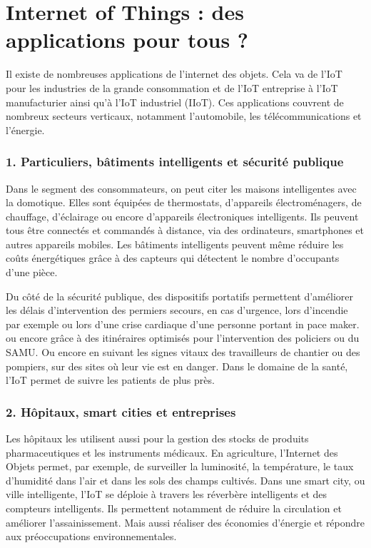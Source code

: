\section{Internet of Things : des applications pour tous ?}
Il existe de nombreuses applications de l’internet des objets. Cela va de l’IoT pour les industries de la grande consommation et de l’IoT entreprise à l’IoT manufacturier ainsi qu’à l’IoT industriel (IIoT). Ces applications couvrent de nombreux secteurs verticaux, notamment l’automobile, les télécommunications et l’énergie.

\subsubsection{1. Particuliers, bâtiments intelligents et sécurité publique}

Dans le segment des consommateurs, on peut citer les maisons intelligentes avec la domotique. Elles sont équipées de thermostats, d’appareils électroménagers, de chauffage, d’éclairage ou encore d’appareils électroniques intelligents. Ils peuvent tous être connectés et commandés à distance, via des ordinateurs, smartphones et autres appareils mobiles. Les bâtiments intelligents peuvent même réduire les coûts énergétiques grâce à des capteurs qui détectent le nombre d’occupants d’une pièce.

Du côté de la sécurité publique, des dispositifs portatifs permettent d’améliorer les délais d’intervention des permiers secours, en cas d’urgence, lors d’incendie par exemple ou lors d’une crise cardiaque d’une personne portant in pace maker. ou encore grâce à des itinéraires optimisés pour l’intervention des policiers ou du SAMU. Ou encore en suivant les signes vitaux des travailleurs de chantier ou des pompiers, sur des sites où leur vie est en danger. Dans le domaine de la santé, l’IoT permet de suivre les patients de plus près.

\subsubsection{2. Hôpitaux, smart cities et entreprises}

Les hôpitaux les utilisent aussi pour la gestion des stocks de produits pharmaceutiques et les instruments médicaux. En agriculture, l’Internet des Objets permet, par exemple, de surveiller la luminosité, la température, le taux d’humidité dans l’air et dans les sols des champs cultivés. Dans une smart city, ou ville intelligente, l’IoT se déploie à travers les réverbère intelligents et des compteurs intelligents. Ils permettent notamment de réduire la circulation et améliorer l’assainissement. Mais aussi réaliser des économies d’énergie et répondre aux préoccupations environnementales.

